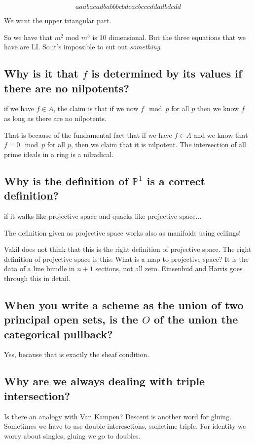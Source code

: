 \documentclass{book}
\renewcommand{\P}{\ensuremath{\mathbb{P}}}
\theoremstyle{definition}
\begin{document}
$$
aa ab ac ad
ba bb bc bd
ca cb cc cd
da db dc dd
$$

We want the upper triangular part.

So we have that $m^2$ mod $m^3$ is 10 dimensional. But the three equations
that we have are LI. So it's impossible to cut out \emph{something}.

\subsection{Why is it that $f$ is determined by its values if there are no nilpotents?}
if we have $f \in A$, the claim is that if we now $f \mod p$ for all $p$ then
we know $f$ as long as there are no nilpotents.

That is because of the fundamental fact that if we have $f \in A$ and we 
know that $f = 0 \mod p$ for all $p$, then we claim that it is nilpotent.
The intersection of all prime ideals in a ring is a nilradical.

\subsection{Why is the definition of $\P^1$ is a correct definition?}
if it walks like projective space and quacks like projective space...

The definition given as projective space works also as manifolds using
ceilings! 

Vakil does not think that this is the right definition of projective space.
The right definition of projective space is this: What is a map to
projective space?  It is the data of a line bundle in $n+1$ sections,
not all zero. Einsenbud and Harris goes through this in detail.

\subsection{When you write a scheme as the union of two principal open sets, is the $O$ of the union the categorical pullback?}
Yes, because that is exactly the sheaf condition.

\subsection{Why are we always dealing with triple intersection?}
Is there an analogy with Van Kampen? Descent is another word for gluing.
Sometimes we have to use double interesctions, sometime triple. For identity
we worry about singles, gluing we go to doubles.
\end{document}
